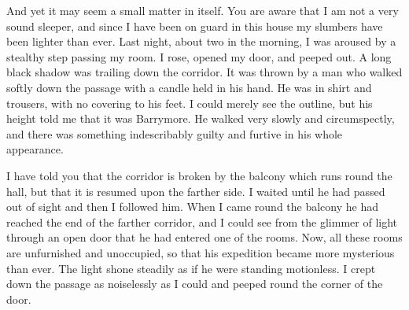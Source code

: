 \documentclass[paper=5.5in:8.5in,BCOR=7mm,twoside,DIV=calc,12pt,usegeometry,openany,chapterprefix,endperiod,headings=big]{scrbook} %
\begin{document}
And yet it may seem a small matter in itself. You are aware that I am not a very \newline sound sleeper, and since I have been on guard in this house my slumbers have been light\-er than ever. Last night, about two in the morning, I was aroused by a stealthy step pass\-ing my room. I rose, opened my door, and peeped out. A long black sha\-dow was trailing down the corridor. It was thrown by a man who walked softly down the passage with a candle held in his hand. He was in shirt and trousers, with no covering to his feet. I could merely see the outline, but his height told me that it was Barrymore. He walked very slowly and circumspectly, and there was something indescribably guilty and furtive in his whole appearance.

I have told you that the corridor is broken by the balcony which runs round the hall, but that it is resumed upon the farther side. I waited until he had passed out of sight and then I followed him. When I came round the balcony he had reached the end of the farther corridor, and I could see from the glimmer of light through an open door that he had entered one of the rooms. Now, all these rooms are unfurnished and unoccupied, so that his expedition became more mysterious than ever. The light shone steadily as if he were standing motionless. I crept down the passage as noiselessly as I could and peeped round the corner of the door.

\end{document}
